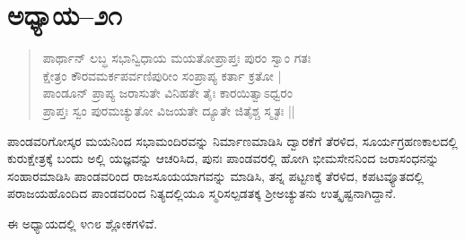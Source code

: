 \section{ಅಧ್ಯಾಯ–೨೧}

\begin{verse}
ಪಾರ್ಥಾನ್ ಲಬ್ಧ ಸಭಾನ್ವಿಧಾಯ ಮಯತೋಪ್ರಾಪ್ತಃ ಪುರಂ ಸ್ವಾಂ ಗತಃ\\ ಕ್ಷೇತ್ರಂ ಕೌರವಮರ್ಕಪರ್ವಣಿಪುರೀಂ ಸಂಪ್ರಾಪ್ಯ ಕರ್ತಾ ಕ್ರತೋ | \\ ಪಾಂಡೂನ್ ಪ್ರಾಪ್ಯ ಜರಾಸುತೇ ವಿನಿಹತೇ ತೈಃ ಕಾರಯಿತ್ವಾಽಧ್ವರಂ \\ ಪ್ರಾಪ್ತಃ ಸ್ವಂ ಪುರಮಚ್ಯುತೋ ವಿಜಯತೇ ದ್ಯೂತೇ ಜಿತೈಶ್ಚ ಸ್ಮೃತಃ ||
\end{verse}

ಪಾಂಡವರಿಗೋಸ್ಕರ ಮಯನಿಂದ ಸಭಾಮಂದಿರವನ್ನು ನಿರ್ಮಾಣಮಾಡಿಸಿ ದ್ವಾರಕೆಗೆ ತೆರಳಿದ, ಸೂರ್ಯಗ್ರಹಣಕಾಲದಲ್ಲಿ ಕುರುಕ್ಷೇತ್ರಕ್ಕೆ ಬಂದು ಅಲ್ಲಿ ಯಜ್ಞವನ್ನು ಆಚರಿಸಿದ, ಪುನಃ ಪಾಂಡವರಲ್ಲಿ ಹೋಗಿ ಭೀಮಸೇನನಿಂದ ಜರಾಸಂಧನನ್ನು ಸಂಹಾರಮಾಡಿಸಿ ಪಾಂಡವರಿಂದ ರಾಜಸೂಯಯಾಗವನ್ನು ಮಾಡಿಸಿ, ತನ್ನ ಪಟ್ಟಣಕ್ಕೆ ತೆರಳಿದ, ಕಪಟವ್ಯೂತದಲ್ಲಿ ಪರಾಜಯಹೊಂದಿದ ಪಾಂಡವರಿಂದ ನಿತ್ಯದಲ್ಲಿಯೂ ಸ್ಮರಿಸಲ್ಪಡತಕ್ಕ ಶ‍್ರೀಅಚ್ಯುತನು ಉತ್ಕೃಷ್ಟನಾಗಿದ್ದಾನೆ.

ಈ ಅಧ್ಯಾಯದಲ್ಲಿ ೪೧೮ ಶ್ಲೋಕಗಳಿವೆ.

